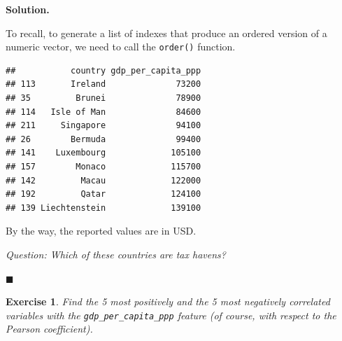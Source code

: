 \documentclass[10pt,b5paper,krantz1]{krantz}
\newenvironment{Shaded}{\begin{snugshade}}{\end{snugshade}}
\newcommand{\DataTypeTok}[1]{\textcolor[rgb]{0.27,0.27,0.27}{#1}}
\newcommand{\DecValTok}[1]{\textcolor[rgb]{0.06,0.06,0.06}{#1}}
\newcommand{\KeywordTok}[1]{\textcolor[rgb]{0.27,0.27,0.27}{\textbf{#1}}}
\newcommand{\NormalTok}[1]{#1}
\newcommand{\OperatorTok}[1]{\textcolor[rgb]{0.43,0.43,0.43}{\textbf{#1}}}
\newcommand{\OtherTok}[1]{\textcolor[rgb]{0.37,0.37,0.37}{#1}}
\newcommand{\StringTok}[1]{\textcolor[rgb]{0.5,0.5,0.5}{#1}}
\newtheorem{exercise}{Exercise}[chapter]
\newenvironment{solution}{%
\bigskip\noindent\textbf{Solution. }%
\it\ignorespaces%
\ignorespaces%
}{\ignorespaces%
\hfill$\blacksquare$%
}
\begin{document}
\begin{solution}

To recall, to generate a list of indexes that produce an ordered
version of a numeric vector, we need to call the \texttt{order()} function.

\begin{Shaded}
\end{Shaded}

\begin{verbatim}
##           country gdp_per_capita_ppp
## 113       Ireland              73200
## 35         Brunei              78900
## 114   Isle of Man              84600
## 211     Singapore              94100
## 26        Bermuda              99400
## 141    Luxembourg             105100
## 157        Monaco             115700
## 142         Macau             122000
## 192         Qatar             124100
## 139 Liechtenstein             139100
\end{verbatim}

By the way, the reported values are in USD.

\emph{Question: Which of these countries are tax havens?}

\end{solution}

\begin{exercise}

Find the 5 most positively and the 5 most negatively
correlated variables with the \texttt{gdp\_per\_capita\_ppp} feature
(of course, with respect to the Pearson coefficient).

\end{exercise}
\end{document}
